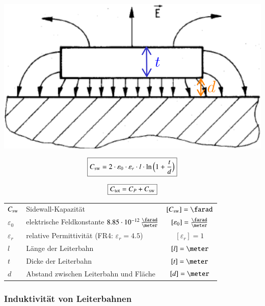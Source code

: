\begin{minipage}[c]{0.28\columnwidth}
    \includegraphics[width=\columnwidth]{images/kapazitaet_leiterbahn_plane.png}
\end{minipage}
\hfill
\begin{minipage}[c]{0.45\columnwidth}
    $$ \boxed{C_{\rm sw} = 2 \cdot \varepsilon_0 \cdot \varepsilon_r \cdot l \cdot \ln \Big( 1 + \frac{t}{d} \Big) } $$
\end{minipage}
\hfill
\begin{minipage}[c]{0.23\columnwidth}
    $$ \boxed{C_{\rm tot} = C_P + C_{\rm sw}} $$
\end{minipage}

\begin{tabular}{llc}
    $C_{\rm sw}$    & Sidewall-Kapazität                                                        & $[C_{\rm sw}] = \farad$ \\
    $\varepsilon_0$ & elektrische Feldkonstante $8.85 \cdot 10^{-12} \, \frac{\farad}{\meter}$  & $[\varepsilon_0] = \frac{\farad}{\meter}$ \\
    $\varepsilon_r$ & relative Permittivität (FR4: $\varepsilon_r= 4.5$)                        & $[\varepsilon_r] = 1$ \\
    $l$             & Länge der Leiterbahn                                                      & $[l] = \meter$ \\
    $t$             & Dicke der Leiterbahn                                                      & $[t] = \meter$ \\
    $d$             & Abstand zwischen Leiterbahn und Fläche                                    & $[d] = \meter$
\end{tabular}


\subsubsection{Induktivität von Leiterbahnen}

